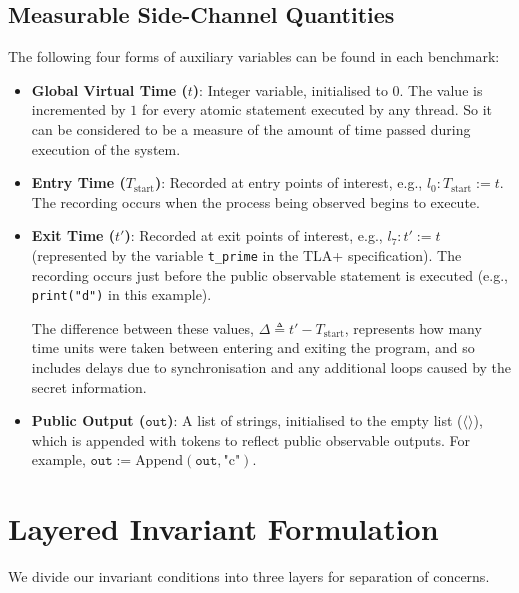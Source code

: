 \documentclass[a4paper,12pt]{report}
\begin{document}
\subsection{Measurable Side-Channel Quantities}
The following four forms of auxiliary variables can be found in each benchmark:
\begin{itemize}[itemsep=0.2em, topsep=0.15em]
    \item \textbf{Global Virtual Time ($t$)}: Integer variable, initialised to $0$. The value is incremented by $1$ for every atomic statement executed by any thread. So it can be considered to be a measure of the amount of time passed during execution of the system.
    \item \textbf{Entry Time ($T_{\text{start}}$)}: Recorded at entry points of interest, e.g., $l_0: T_{\text{start}} := t$. The recording occurs when the process being observed begins to execute.
    \item \textbf{Exit Time ($t'$)}: Recorded at exit points of interest, e.g., $l_7: t' := t$ (represented by the variable \texttt{t\_prime} in the TLA+ specification). The recording occurs just before the public observable statement is executed (e.g., \texttt{print("d")} in this example).
    
    The difference between these values, $\Delta \triangleq t' - T_{\text{start}}$, represents how many time units were taken between entering and exiting the program, and so includes delays due to synchronisation and any additional loops caused by the secret information.
    \item \textbf{Public Output ($\texttt{out}$)}: A list of strings, initialised to the empty list ($\langle \rangle$), which is appended with tokens to reflect public observable outputs. For example, $\texttt{out} := \text{Append}(\texttt{out}, \text{"c"})$.
\end{itemize}

\section{Layered Invariant Formulation}
We divide our invariant conditions into three layers for separation of concerns.
\end{document}
